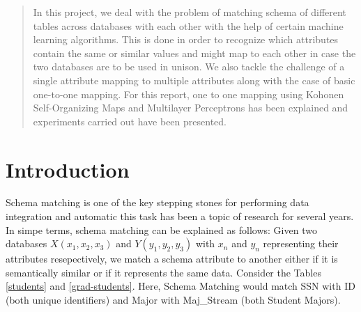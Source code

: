 \documentclass[conference]{IEEEtran}
\begin{document}
\begin{abstract}
In this project, we deal with the problem of matching schema of different tables across databases with each other with the help of certain machine learning algorithms. This is done in order to recognize which attributes contain the same or similar values and might map to each other in case the two databases are to be used in unison. We also tackle the challenge of a single attribute mapping to multiple attributes along with the case of basic one-to-one mapping. For this report, one to one mapping using Kohonen Self-Organizing Maps and Multilayer Perceptrons has been explained and experiments carried out have been presented. 
\end{abstract}



%
\IEEEpeerreviewmaketitle



\section{Introduction}
Schema matching is one of the key stepping stones for performing data integration and automatic this task has been a topic of research for several years. In simpe terms, schema matching can be explained as follows: Given two databases $X(x_1, x_2, x_3)$ and $Y(y_1, y_2, y_3)$ with $x_n$ and $y_n$ representing their attributes resepectively, we match a schema attribute to another either if it is semantically similar or if it represents the same data. Consider the Tables \ref{students} and \ref{grad-students}. Here, Schema Matching would match SSN with ID (both unique identifiers) and Major with Maj\_Stream (both Student Majors). 
\end{document}
